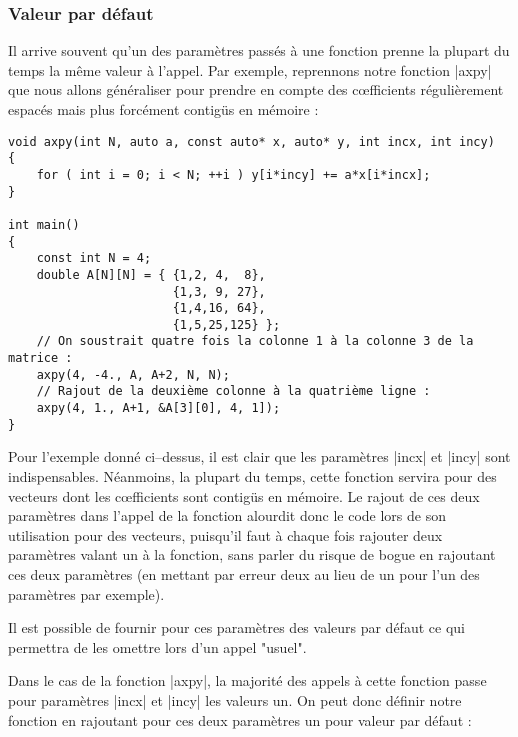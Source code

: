 \subsubsection{Valeur par défaut}

Il arrive souvent qu'un des paramètres passés à une fonction prenne la plupart du temps la même valeur à l'appel. Par exemple,
reprennons notre fonction |axpy| que nous allons généraliser pour prendre en compte des c{\oe}fficients régulièrement espacés
mais plus forcément contigüs en mémoire :

\begin{lstlisting}[caption=Généralisation de la fonction axpy]
void axpy(int N, auto a, const auto* x, auto* y, int incx, int incy)
{
    for ( int i = 0; i < N; ++i ) y[i*incy] += a*x[i*incx];
}

int main()
{
    const int N = 4;
    double A[N][N] = { {1,2, 4,  8}, 
                       {1,3, 9, 27},
                       {1,4,16, 64},
                       {1,5,25,125} };
    // On soustrait quatre fois la colonne 1 à la colonne 3 de la matrice :
    axpy(4, -4., A, A+2, N, N);
    // Rajout de la deuxième colonne à la quatrième ligne :
    axpy(4, 1., A+1, &A[3][0], 4, 1]);
}
\end{lstlisting}

Pour l'exemple donné ci--dessus, il est clair que les paramètres |incx| et |incy| sont indispensables. Néanmoins,
la plupart du temps, cette fonction servira pour des vecteurs dont les c{\oe}fficients sont contigüs en mémoire.
Le rajout de ces deux paramètres dans l'appel de la fonction alourdit donc le code lors de son utilisation pour des vecteurs, puisqu'il faut à chaque fois rajouter deux paramètres valant un à la fonction, sans parler du risque de bogue en rajoutant ces deux paramètres (en mettant par erreur deux au lieu de un pour l'un des paramètres par exemple).

Il est possible de fournir pour ces paramètres des valeurs par défaut ce qui permettra de les omettre lors d'un appel "usuel".

Dans le cas de la fonction |axpy|, la majorité des appels à cette fonction passe pour paramètres |incx| et |incy| les valeurs un. On peut donc définir notre fonction en rajoutant pour ces deux paramètres un pour valeur par défaut :

